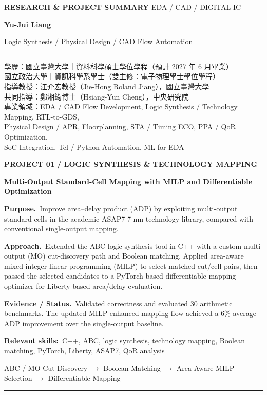 \documentclass[a4paper,11pt]{article}
\newcommand{\dochead}[2]{%
  {\footnotesize\bfseries\color{muted} RESEARCH \& PROJECT SUMMARY}%
  \hfill{\footnotesize\color{muted} #1}\par\vspace{4pt}
  {\fontsize{20}{23}\selectfont\bfseries Yu-Jui Liang\hspace{0.4em}{\fontsize{17}{20}\selectfont 梁栯睿}}\par\vspace{3pt}
  {\small\color{muted}#2}\par\vspace{7pt}
  \color{rulecol}\rule{\linewidth}{1.1pt}\color{ink}\vspace{10pt}}
\newcommand{\metadata}[1]{{\small #1}\par\vspace{9pt}}
\newcommand{\project}[6]{%
  {\small\color{muted}\bfseries #1}\par\vspace{3pt}
  {\fontsize{12}{14}\selectfont\bfseries #2}\par\vspace{7pt}
  {\small\textbf{Purpose.}\ #3}\par\vspace{5pt}
  {\small\textbf{Approach.}\ #4}\par\vspace{5pt}
  {\small\textbf{Evidence / Status.}\ #5}\par\vspace{5pt}
  {\footnotesize\textbf{Relevant skills:}\ #6}\par\vspace{8pt}}
\newcommand{\flowline}[1]{%
  \noindent\colorbox{shade}{%
    \parbox{\dimexpr\linewidth-2\fboxsep}{\centering\footnotesize\color{muted} #1}}
  \par\vspace{12pt}}
\newcommand{\separate}{%
  \par\noindent\color{rulecol}\rule{\linewidth}{0.7pt}\color{ink}\par\vspace{11pt}}
\begin{document}
\dochead{EDA / CAD / DIGITAL IC}{Logic Synthesis \quad / \quad Physical Design \quad / \quad CAD Flow Automation}
\metadata{%
學歷：國立臺灣大學｜資料科學碩士學位學程（預計 2027 年 6 月畢業）\\[3pt]
\phantom{學歷：}國立政治大學｜資訊科學系學士（雙主修：電子物理學士學位學程）\\[3pt]
指導教授：江介宏教授（Jie-Hong Roland Jiang），國立臺灣大學\\[3pt]
共同指導：鄭湘筠博士（Hsiang-Yun Cheng），中央研究院\\[3pt]
專業領域：EDA / CAD Flow Development, Logic Synthesis / Technology Mapping, RTL-to-GDS,\\[3pt]
\phantom{專業領域：}Physical Design / APR, Floorplanning, STA / Timing ECO, PPA / QoR Optimization,\\[3pt]
\phantom{專業領域：}SoC Integration, Tcl / Python Automation, ML for EDA}

\project{PROJECT 01 \quad / \quad LOGIC SYNTHESIS \& TECHNOLOGY MAPPING}
{Multi-Output Standard-Cell Mapping with MILP and Differentiable Optimization}
{Improve area--delay product (ADP) by exploiting multi-output standard cells in the academic ASAP7 7-nm technology library, compared with conventional single-output mapping.}
{Extended the ABC logic-synthesis tool in C++ with a custom multi-output (MO) cut-discovery path and Boolean matching. Applied area-aware mixed-integer linear programming (MILP) to select matched cut/cell pairs, then passed the selected candidates to a PyTorch-based differentiable mapping optimizer for Liberty-based area/delay evaluation.}
{Validated correctness and evaluated 30 arithmetic benchmarks. The updated MILP-enhanced mapping flow achieved a 6\% average ADP improvement over the single-output baseline.}
{C++, ABC, logic synthesis, technology mapping, Boolean matching, PyTorch, Liberty, ASAP7, QoR analysis}
\flowline{ABC / MO Cut Discovery $\longrightarrow$ Boolean Matching $\longrightarrow$ Area-Aware MILP Selection $\longrightarrow$ Differentiable Mapping}
\separate
\end{document}
